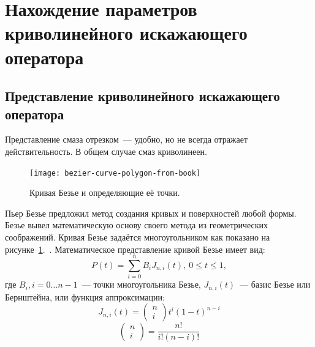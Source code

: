 \section{Нахождение параметров криволинейного искажающего оператора}

\subsection{Представление криволинейного искажающего оператора}
Представление смаза отрезком~--- удобно, но не всегда отражает действительность. В общем случае смаз криволинеен.

\begin{figure}[h!]
	\centering\texttt{[image: bezier-curve-polygon-from-book]}
	\caption{Кривая Безье и определяющие её точки.}
	\label{fig:bezierPolygon}
\end{figure}

Пьер Безье предложил метод создания кривых и поверхностей любой формы. Безье вывел математическую основу своего метода из геометрических соображений. Кривая Безье задаётся многоугольником как показано на рисунке~\ref{fig:bezierPolygon}.~\cite{mathBasicsOfCopmuterGraphics}.
Математическое представление кривой Безье имеет вид:
\begin{equation}
P(t) = \sum_{i=0}^{n} B_i J_{n,i}(t),\ 0\leq t \leq 1,
\label{eq:bezierCurveN}
\end{equation}
где $B_i, i=0\dots n-1$~--- точки многоугольника Безье, $J_{n,i}(t)$~--- базис Безье или Бернштейна, или функция аппроксимации:
\begin{equation*}
J_{n,i}(t) = \begin{pmatrix}
n \\ i
\end{pmatrix} t^i (1-t)^{n-i}
\end{equation*}
\begin{equation*}
\begin{pmatrix}
n \\ i
\end{pmatrix} = \frac{n!}{i!(n-i)!}
\end{equation*}

